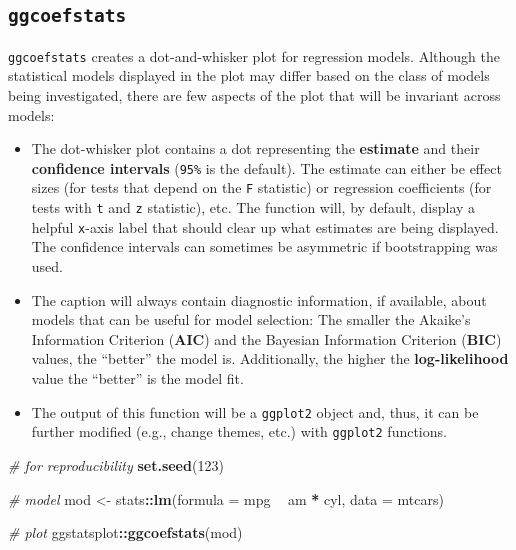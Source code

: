 \documentclass[]{article}
\newenvironment{Shaded}{\begin{snugshade}}{\end{snugshade}}
\newcommand{\CommentTok}[1]{\textcolor[rgb]{0.56,0.35,0.01}{\textit{#1}}}
\newcommand{\DataTypeTok}[1]{\textcolor[rgb]{0.13,0.29,0.53}{#1}}
\newcommand{\DecValTok}[1]{\textcolor[rgb]{0.00,0.00,0.81}{#1}}
\newcommand{\KeywordTok}[1]{\textcolor[rgb]{0.13,0.29,0.53}{\textbf{#1}}}
\newcommand{\NormalTok}[1]{#1}
\newcommand{\OperatorTok}[1]{\textcolor[rgb]{0.81,0.36,0.00}{\textbf{#1}}}
\newcommand{\StringTok}[1]{\textcolor[rgb]{0.31,0.60,0.02}{#1}}
\begin{document}
\hypertarget{ggcoefstats}{%
\subsection{\texorpdfstring{\texttt{ggcoefstats}}{ggcoefstats}}\label{ggcoefstats}}

\texttt{ggcoefstats} creates a dot-and-whisker plot for regression
models. Although the statistical models displayed in the plot may differ
based on the class of models being investigated, there are few aspects
of the plot that will be invariant across models:

\begin{itemize}
\item
  The dot-whisker plot contains a dot representing the \textbf{estimate}
  and their \textbf{confidence intervals} (\texttt{95\%} is the
  default). The estimate can either be effect sizes (for tests that
  depend on the \texttt{F} statistic) or regression coefficients (for
  tests with \texttt{t} and \texttt{z} statistic), etc. The function
  will, by default, display a helpful \texttt{x}-axis label that should
  clear up what estimates are being displayed. The confidence intervals
  can sometimes be asymmetric if bootstrapping was used.
\item
  The caption will always contain diagnostic information, if available,
  about models that can be useful for model selection: The smaller the
  Akaike's Information Criterion (\textbf{AIC}) and the Bayesian
  Information Criterion (\textbf{BIC}) values, the ``better'' the model
  is. Additionally, the higher the \textbf{log-likelihood} value the
  ``better'' is the model fit.
\item
  The output of this function will be a \texttt{ggplot2} object and,
  thus, it can be further modified (e.g., change themes, etc.) with
  \texttt{ggplot2} functions.
\end{itemize}

\begin{Shaded}
\begin{Highlighting}[]
\CommentTok{# for reproducibility}
\KeywordTok{set.seed}\NormalTok{(}\DecValTok{123}\NormalTok{)}

\CommentTok{# model}
\NormalTok{mod <-}\StringTok{ }\NormalTok{stats}\OperatorTok{::}\KeywordTok{lm}\NormalTok{(}\DataTypeTok{formula =}\NormalTok{ mpg }\OperatorTok{~}\StringTok{ }\NormalTok{am }\OperatorTok{*}\StringTok{ }\NormalTok{cyl, }\DataTypeTok{data =}\NormalTok{ mtcars)}

\CommentTok{# plot}
\NormalTok{ggstatsplot}\OperatorTok{::}\KeywordTok{ggcoefstats}\NormalTok{(mod)}
\end{Highlighting}
\end{Shaded}
\end{document}
